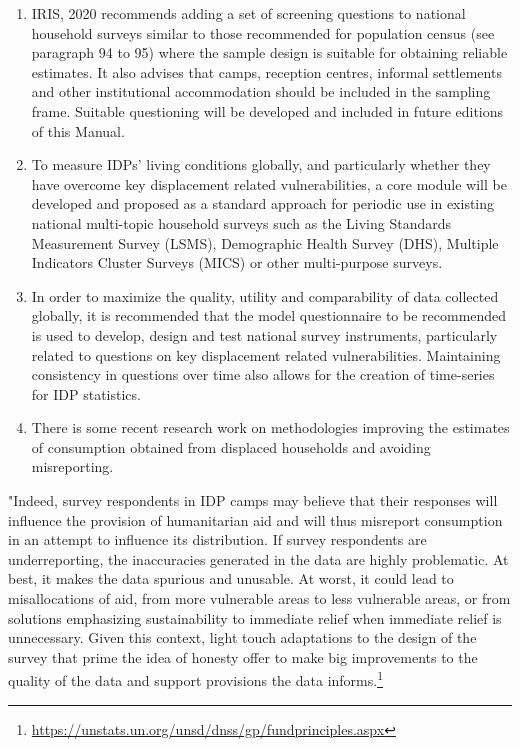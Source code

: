 \documentclass[
]{article}
\begin{document}
\begin{enumerate}
\def\labelenumi{\arabic{enumi}.}
\setcounter{enumi}{124}
\item
  IRIS, 2020 recommends adding a set of screening questions to
  national household surveys similar to those recommended for
  population census (see paragraph 94 to 95) where the sample design
  is suitable for obtaining reliable estimates. It also advises that
  camps, reception centres, informal settlements and other
  institutional accommodation should be included in the sampling
  frame. Suitable questioning will be developed and included in future
  editions of this Manual.
\item
  To measure IDPs' living conditions globally, and particularly
  whether they have overcome key displacement related vulnerabilities,
  a core module will be developed and proposed as a standard approach
  for periodic use in existing national multi-topic household surveys
  such as the Living Standards Measurement Survey (LSMS), Demographic
  Health Survey (DHS), Multiple Indicators Cluster Surveys (MICS) or
  other multi-purpose surveys.
\item
  In order to maximize the quality, utility and comparability of data
  collected globally, it is recommended that the model questionnaire
  to be recommended is used to develop, design and test national
  survey instruments, particularly related to questions on key
  displacement related vulnerabilities. Maintaining consistency in
  questions over time also allows for the creation of time-series for
  IDP statistics.
\item
  There is some recent research work on methodologies improving the
  estimates of consumption obtained from displaced households and
  avoiding misreporting.
\end{enumerate}

"Indeed, survey respondents in IDP camps may believe that their
responses will influence the provision of humanitarian aid and will thus
misreport consumption in an attempt to influence its distribution. If
survey respondents are underreporting, the inaccuracies generated in the
data are highly problematic. At best, it makes the data spurious and
unusable. At worst, it could lead to misallocations of aid, from more
vulnerable areas to less vulnerable areas, or from solutions emphasizing
sustainability to immediate relief when immediate relief is unnecessary.
Given this context, light touch adaptations to the design of the survey
that prime the idea of honesty offer to make big improvements to the
quality of the data and support provisions the data informs.\footnote{\url{https://unstats.un.org/unsd/dnss/gp/fundprinciples.aspx}}
\end{document}
